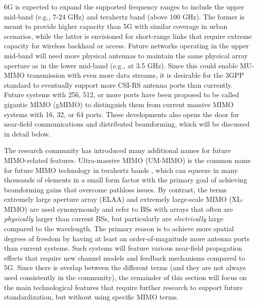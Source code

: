 \documentclass[lettersize,journal]{IEEEtran}
\begin{document}
6G is expected to expand the supported frequency ranges to include the upper mid-band (e.g., 7-24 GHz) and terahertz band (above 100 GHz). The former is meant to provide higher capacity than 5G with similar coverage in urban scenarios, while the latter is envisioned for short-range links that require extreme capacity for wireless backhaul or access.
Future networks operating in the upper mid-band will need more physical antennas to maintain the same physical array aperture as in the lower mid-band (e.g., at 3.5 GHz). Since this could enable MU-MIMO transmission with even more data streams, it is desirable for the 3GPP standard to eventually support more CSI-RS antenna ports than currently. Future systems with 256, 512, or more ports have been proposed to be called gigantic MIMO (gMIMO) \cite{GiganticMIMO} to distinguish them from current massive MIMO systems with 16, 32, or 64 ports. These developments also opens the door for near-field communications and distributed beamforming, which will be discussed in detail below.

The research community has introduced many additional names for future MIMO-related features. 
Ultra-massive MIMO (UM-MIMO) is the common name for future MIMO technology in terahertz bands \cite{UM1,UM2,UM3}, which can squeeze in many thousands of elements in a small form factor with the primary goal of achieving beamforming gains that overcome pathloss issues.
By contrast, the terms extremely large aperture array (ELAA) \cite{emilten} and extremely large-scale MIMO (XL-MIMO) \cite{XL1,XL2} are used synonymously and refer to BSs with arrays that often are \emph{physically} larger than current BSs, but particularly are \emph{electrically} large compared to the wavelength. The primary reason is to achieve more spatial degrees of freedom by having at least an order-of-magnitude more antenna ports than current systems. 
Such systems will feature various near-field propagation effects that require new channel models and feedback mechanisms compared to 5G.
Since there is overlap between the different terms (and they are not always used consistently in the community), the remainder of this section will focus on the main technological features that require further research to support future standardization, but without using specific MIMO terms.

\end{document}
